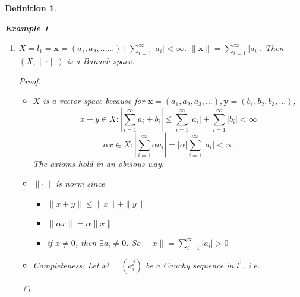 \documentclass{article}
\newtheorem*{definition}{Definition}
\newtheorem*{remark}{Remark}
\newtheorem*{example}{Example}
\begin{document}
\begin{definition}
\begin{example}
\begin{enumerate}
\[            \] 
            $f_n$ is actually a Cauchy sequence in $(X, d_1)$, since \\
            $d_1(f_n, f_m) \le d_1(f_n, f_0) + d_1(f_0, f_m) \le \frac{1}{2n} + \frac{1}{2m}$.
            Conclusion: $(C([0, 1]), d_1)$ is NOT complete.
            \begin{remark}
                $C([0, 1]) \subset L^1([0, 1])$ and we will see $(L^1, d_1)$ is complete.
            \end{remark}
            In general, for any incomplete metric space $(X, d)$, it is possible to construct a complete metric space
            $(\overline{X}, \overline{d})$ so that $X$ is dense(we will define this next time) in $\overline{X}$ and
            $\overline{d}|_X = d$.
            The procedure is the same as $\mathbb{Q} \rightarrow \mathbb{R}$.
            See HW next time.
            \item $X = l_1 = {\mathbf{x}=(a_1, a_2, ......)\mid\sum_{i=1}^{\infty}{|a_i| < \infty}}$.
            $\|\mathbf{x}\| = \sum_{i=1}^{\infty}{|a_i|}$. Then $(X, \|\cdot\|)$ is a Banach space.
            \begin{proof} \hfill
                \begin{itemize}
                    \item $X$ is a vector space because for 
                    $\mathbf{x}=(a_1, a_2, a_3, ...), \mathbf{y}=(b_1, b_2, b_3, ...)$,
                    \[
                    x + y \in X: |\sum_{i=1}^{\infty}{a_i + b_i}| \le \sum_{i=1}^{\infty}{|a_i|} + \sum_{i=1}^{\infty}{|b_i|} < \infty
                    \]
                    \[
                    \alpha x \in X: |\sum_{i=1}^{\infty}{\alpha a_i}| = |\alpha|\sum_{i=1}^{\infty}{|a_i| < \infty}
                    \]
                    The axioms hold in an obvious way.
                    \item $\|\cdot\|$ is norm since
                    \begin{itemize}
                        \item $\|x + y\| \le \|x\| + \|y\|$
                        \item $\|\alpha x\| = \alpha \|x\|$
                        \item if $x \ne 0$, then $\exists a_i \ne 0$. So $\|x\| = \sum_{i=1}^{\infty}{|a_i|} > 0$
                    \end{itemize}
                    \item Completeness:
                    Let $x^j = (a_i^j)$ be a Cauchy sequence in $l^1$, i.e.

\end{itemize}
\end{proof}
\end{enumerate}
\end{example}
\end{definition}
\end{document}
